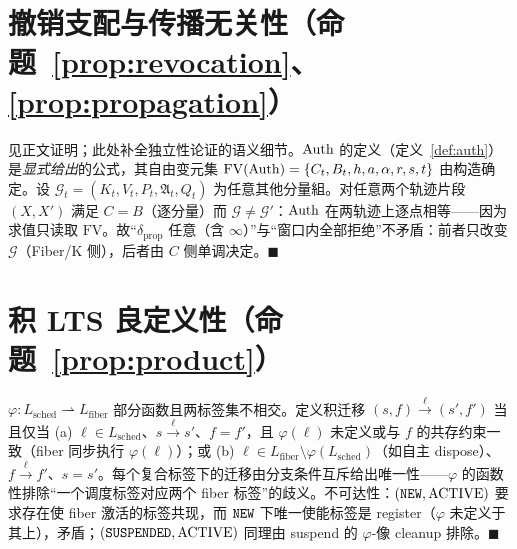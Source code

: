 \section{撤销支配与传播无关性（命题~\ref{prop:revocation}、\ref{prop:propagation}）}

见正文证明；此处补全独立性论证的语义细节。$\operatorname{Auth}$ 的定义（定义~\ref{def:auth}）是\emph{显式给出}的公式，其自由变元集 $\mathrm{FV}(\operatorname{Auth})=\{C_t,B_t,h,a,\alpha,r,s,t\}$ 由构造确定。设 $\mathcal{G}_t=(K_t,V_t,P_t,\mathfrak{A}_t,Q_t)$ 为任意其他分量組。对任意两个轨迹片段 $(X,X')$ 满足 $C=B$（逐分量）而 $\mathcal{G}\ne\mathcal{G}'$：$\operatorname{Auth}$ 在两轨迹上逐点相等——因为求值只读取 $\mathrm{FV}$。故“$\delta_{\mathrm{prop}}$ 任意（含 $\infty$）”与“窗口内全部拒绝”不矛盾：前者只改变 $\mathcal{G}$（Fiber/K 侧），后者由 $C$ 侧单调决定。$\blacksquare$

\section{积 LTS 良定义性（命题~\ref{prop:product}）}

$\varphi:L_{\mathrm{sched}}\rightharpoonup L_{\mathrm{fiber}}$ 部分函数且两标签集不相交。定义积迁移 $(s,f)\xrightarrow{\ell}(s',f')$ 当且仅当 (a) $\ell\in L_{\mathrm{sched}}$、$s\xrightarrow{\ell}s'$、$f=f'$，且 $\varphi(\ell)$ 未定义或与 $f$ 的共存约束一致（fiber 同步执行 $\varphi(\ell)$）；或 (b) $\ell\in L_{\mathrm{fiber}}\setminus\varphi(L_{\mathrm{sched}})$（如自主 dispose）、$f\xrightarrow{\ell}f'$、$s=s'$。每个复合标签下的迁移由分支条件互斥给出唯一性——$\varphi$ 的函数性排除“一个调度标签对应两个 fiber 标签”的歧义。不可达性：$(\texttt{NEW},\text{ACTIVE})$ 要求存在使 fiber 激活的标签共现，而 $\texttt{NEW}$ 下唯一使能标签是 register（$\varphi$ 未定义于其上），矛盾；$(\texttt{SUSPENDED},\text{ACTIVE})$ 同理由 suspend 的 $\varphi$-像 cleanup 排除。$\blacksquare$
